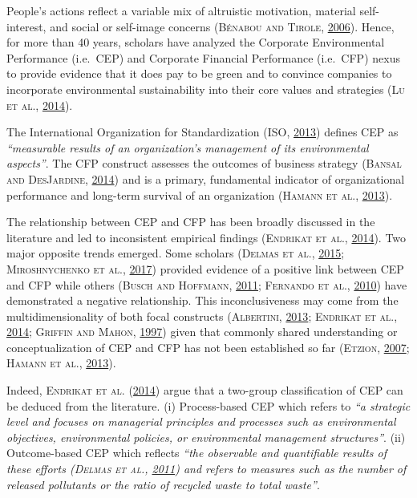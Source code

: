 \documentclass[12pt,]{article}
\begin{document}
People's actions reflect a variable mix of altruistic motivation,
material self-interest, and social or self-image concerns
(\textsc{Bénabou and Tirole},
\protect\hyperlink{ref-BenabouIncentivesProsocialBehavior2006}{2006}).
Hence, for more than 40 years, scholars have analyzed the Corporate
Environmental Performance (i.e.~CEP) and Corporate Financial Performance
(i.e.~CFP) nexus to provide evidence that it does pay to be green and to
convince companies to incorporate environmental sustainability into
their core values and strategies (\textsc{Lu et al.},
\protect\hyperlink{ref-Ludecadedebatenexus2014}{2014}).

The International Organization for Standardization (\textsc{ISO},
\protect\hyperlink{ref-ISO2013}{2013}) defines CEP as \emph{``measurable
results of an organization's management of its environmental aspects''}.
The CFP construct assesses the outcomes of business strategy
(\textsc{Bansal and DesJardine},
\protect\hyperlink{ref-Bansal2014}{2014}) and is a primary, fundamental
indicator of organizational performance and long-term survival of an
organization (\textsc{Hamann et al.},
\protect\hyperlink{ref-Hamann2013}{2013}).

The relationship between CEP and CFP has been broadly discussed in the
literature and led to inconsistent empirical findings (\textsc{Endrikat
et al.},
\protect\hyperlink{ref-EndrikatMakingsenseconflicting2014}{2014}). Two
major opposite trends emerged. Some scholars (\textsc{Delmas et al.},
\protect\hyperlink{ref-Delmas2015}{2015}; \textsc{Miroshnychenko et
al.},
\protect\hyperlink{ref-MiroshnychenkoGreenpracticesfinancial2017}{2017})
provided evidence of a positive link between CEP and CFP while others
(\textsc{Busch and Hoffmann}, \protect\hyperlink{ref-Busch2011a}{2011};
\textsc{Fernando et al.}, \protect\hyperlink{ref-Fernando2010}{2010})
have demonstrated a negative relationship. This inconclusiveness may
come from the multidimensionality of both focal constructs
(\textsc{Albertini}, \protect\hyperlink{ref-Albertini2013}{2013};
\textsc{Endrikat et al.},
\protect\hyperlink{ref-EndrikatMakingsenseconflicting2014}{2014};
\textsc{Griffin and Mahon}, \protect\hyperlink{ref-Griffin1997}{1997})
given that commonly shared understanding or conceptualization of CEP and
CFP has not been established so far (\textsc{Etzion},
\protect\hyperlink{ref-Etzion2007}{2007}; \textsc{Hamann et al.},
\protect\hyperlink{ref-Hamann2013}{2013}).

Indeed, \textsc{Endrikat et al.}
(\protect\hyperlink{ref-EndrikatMakingsenseconflicting2014}{2014}) argue
that a two-group classification of CEP can be deduced from the
literature. (i) Process-based CEP which refers to \emph{``a strategic
level and focuses on managerial principles and processes such as
environmental objectives, environmental policies, or environmental
management structures''}. (ii) Outcome-based CEP which reflects
\emph{``the observable and quantifiable results of these efforts
(\textsc{Delmas et al.}, \protect\hyperlink{ref-Delmas2011a}{2011}) and
refers to measures such as the number of released pollutants or the
ratio of recycled waste to total waste''}.
\end{document}
